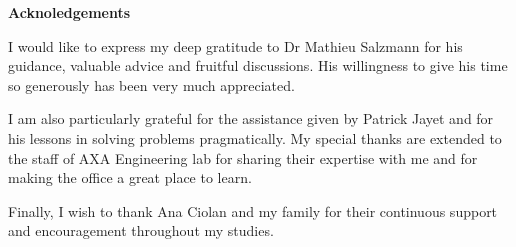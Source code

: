 \newpage
\vspace*{3.5cm}

\centerline{\Large\textbf{Acknoledgements}}\bigskip

\large
I would like to express my deep gratitude to Dr Mathieu Salzmann for his guidance, valuable advice and fruitful discussions. His willingness to give his time so generously has been very much appreciated.

I am also particularly grateful for the assistance given by Patrick Jayet and for his lessons in solving problems pragmatically. My special thanks are extended to the staff of AXA Engineering lab for sharing their expertise with me and for making the office a great place to learn.

Finally, I wish to thank Ana Ciolan and my family for their continuous support and encouragement throughout my studies.

\normalsize
